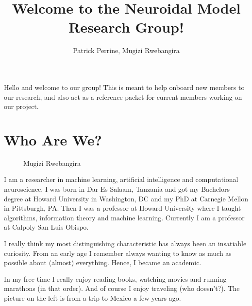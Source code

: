 \documentclass{article}
\title{\textbf{Welcome to the Neuroidal Model\\ Research Group!}}
\author{Patrick Perrine, Mugizi Rwebangira}
\date{}
\begin{document}
 \maketitle

Hello and welcome to our group! This is meant to help onboard new members to our research, and also act as a reference packet for current members working on our project.

\section*{Who Are We?}

\begin{figure}
    \centering
    \Large{Mugizi Rwebangira}\vspace{5mm}
    {%
	   \setlength{\fboxsep}{0pt}%
	   \setlength{\fboxrule}{3pt}%
	 }%
\end{figure} \hfill

I am a researcher in machine learning, artificial intelligence and computational neuroscience. I was born in Dar Es Salaam, Tanzania and got my Bachelors degree at Howard University in Washington, DC and my PhD at Carnegie Mellon in Pittsburgh, PA. Then I was a professor at Howard University where I taught algorithms, information theory and machine learning. Currently I am a professor at Calpoly San Luis Obispo.

I really think my most distinguishing characteristic has always been an insatiable curiosity. From an early age I remember always wanting to know as much as possible about (almost) everything. Hence, I became an academic. 

In my free time I really enjoy reading books, watching movies and running marathons (in that order). And of course I enjoy traveling (who doesn’t?). The picture on the left is from a trip to Mexico a few years ago.

\hfill \\
\end{document}
